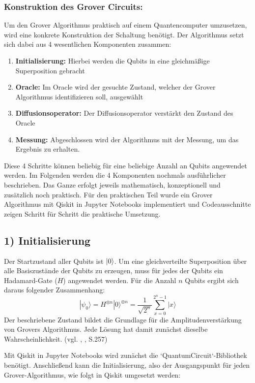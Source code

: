 \subsubsection{Konstruktion des Grover Circuits:}


Um den Grover Algorithmus praktisch auf einem Quantencomputer umzusetzen, wird eine konkrete Konstruktion der Schaltung benötigt. Der Algorithmus setzt sich dabei aus 4 wesentlichen Komponenten zusammen: 
\begin{enumerate}
    \item  \textbf{Initialisierung:} Hierbei werden die Qubits in eine gleichmäßige Superposition gebracht
    \item \textbf{Oracle:} Im Oracle wird der gesuchte Zustand, welcher der Grover Algorithmus identifizieren soll, ausgewählt
    \item \textbf{Diffusionsoperator:} Der Diffusionsoperator verstärkt den Zustand des Oracle
    \item   \textbf{Messung:} Abgeschlossen wird der Algorithmus mit der Messung, um das Ergebnis zu erhalten. 
\end{enumerate}

Diese 4 Schritte können beliebig für eine beliebige Anzahl an Qubits angewendet werden. Im Folgenden werden die 4 Komponenten nochmals ausführlicher beschrieben. Das Ganze erfolgt jeweils mathematisch, konzeptionell und zusätzlich noch praktisch. Für den praktischen Teil wurde ein Grover Algorithmus mit Qiskit in Jupyter Notebooks implementiert und Codeausschnitte zeigen Schritt für Schritt die praktische Umsetzung.

\subsection*{1) Initialisierung}
Der Startzustand aller Qubits ist $\ket{0}$. Um eine gleichverteilte Superposition über alle Basiszustände der Qubits zu erzeugen, muss für jedes der Qubits ein Hadamard-Gate ($H$) angewendet werden. Für die Anzahl $n$ Qubits ergibt sich daraus folgender Zusammenhang:
$$
|\psi_0\rangle = H^{\otimes n}|0\rangle^{\otimes n} = \frac{1}{\sqrt{2^n}} \sum_{x=0}^{2^n-1} |x\rangle
$$
Der beschriebene Zustand bildet die Grundlage für die Amplitudenverstärkung von Grovers Algorithmus. Jede Lösung hat damit zunächst dieselbe Wahrscheinlichkeit. (vgl. \citeauthor{nielsen_quantum_2010}, \citeyear{nielsen_quantum_2010}, S.257)

Mit Qiskit in Jupyter Notebooks wird zunächst die `QuantumCircuit`-Bibliothek benötigt. Anschließend kann die Initialisierung, also der Ausgangspunkt für jeden Grover-Algorithmus, wie folgt in Qiskit umgesetzt werden:
